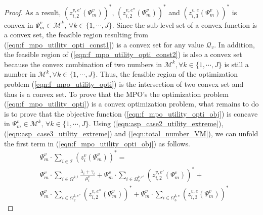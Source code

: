 \documentclass[10pt,journal, compsoc]{IEEEtran}
\begin{document}
\begin{proof}
As a result, $(z_{i,2}^{v, e'}(\Psi_m^v))^*$, $(z_{i,2}^{v, e''}(\Psi_m^v))^*$ and $(z_{i,3}^{v, e}(\Psi_m^v))^*$ is convex in $\Psi_m^v \in \mathcal{M}^k,\, \forall k \in \{1,\cdots, J\}$. Since the sub-level set of a convex function is a convex set, the feasible region resulting from (\ref{eqn:f_mpo_utility_opti_const1}) is a convex set for any value $\mathcal{Q}_v$. In addition, the feasible region of (\ref{eqn:f_mpo_utility_opti_const2}) is also a convex set because the convex combination of two numbers in $\mathcal{M}^k, \forall k \in \{1, \cdots, J\}$ is still a number in $\mathcal{M}^k, \forall k \in \{1, \cdots, J\}$. Thus, the feasible region of the optimization problem (\ref{eqn:f_mpo_utility_opti}) is the intersection of two convex set and thus is a convex set. To prove that the MPO's the optimization problem (\ref{eqn:f_mpo_utility_opti}) is a convex optimization problem, what remains to do is to prove that the objective function (\ref{eqn:f_mpo_utility_opti_obj}) is concave in $\Psi_m^v \in \mathcal{M}^k,\, \forall k \in \{1,\cdots, J\}$. Using (\ref{eqn:asp_case2_utility_extreme}), (\ref{eqn:asp_case3_utility_extreme}) and (\ref{eqn:total_number_VM}), we can unfold the first term in (\ref{eqn:f_mpo_utility_opti_obj}) as follows.
\begin{equation}\label{eqn:mpo_utility_first_term}
\begin{aligned}
&\Psi_m^v \cdot \sum_{i \in \mathcal{I}} (z_{i}^v(\Psi_m^v))^* = \\
&\Psi_m^v \cdot \sum_{i\in \Omega^{k,l}}\frac{\lambda_i + \gamma_i}{\mu_i^v}+
\Psi_m^v \cdot \sum_{i\in \Omega^{k,e'}_{2}}(z_{i,2}^{v,e'}(\Psi_m^v))^* + \\
&\Psi_m^v \cdot \sum_{i\in \Omega^{k,e''}_{2}}(z_{i,2}^{v,e''}(\Psi_m^v))^* + \Psi_m^v \cdot \sum_{i\in \Omega^{k,e}_{3}}(z_{i,3}^{v,e}(\Psi_m^v))^*
\end{aligned}   
\end{equation} 



\end{proof}
\end{document}
